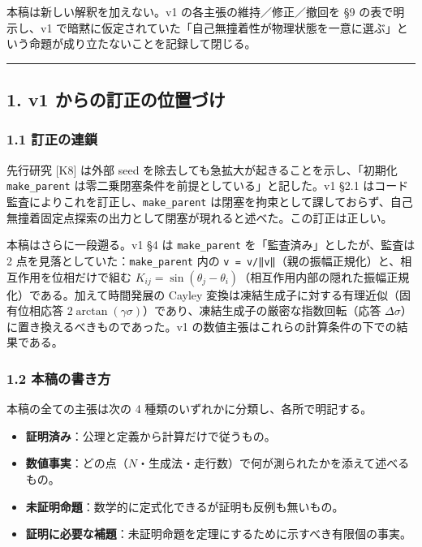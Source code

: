 \documentclass[
  10pt,
  a4paper,
]{ltjsarticle}
\providecommand{\tightlist}{%
  \setlength{\itemsep}{0pt}\setlength{\parskip}{0pt}}
\begin{document}
本稿は新しい解釈を加えない。v1 の各主張の維持／修正／撤回を §9
の表で明示し、v1
で暗黙に仮定されていた「自己無撞着性が物理状態を一意に選ぶ」という命題が成り立たないことを記録して閉じる。

\begin{center}\rule{0.5\linewidth}{0.5pt}\end{center}

\subsection{1. v1
からの訂正の位置づけ}\label{v1-ux304bux3089ux306eux8a02ux6b63ux306eux4f4dux7f6eux3065ux3051}

\subsubsection{1.1 訂正の連鎖}\label{ux8a02ux6b63ux306eux9023ux9396}

先行研究 {[}K8{]} は外部 seed
を除去しても急拡大が起きることを示し、「初期化 \texttt{make\_parent}
は零二乗閉塞条件を前提としている」と記した。v1 §2.1
はコード監査によりこれを訂正し、\texttt{make\_parent}
は閉塞を拘束として課しておらず、自己無撞着固定点探索の出力として閉塞が現れると述べた。この訂正は正しい。

本稿はさらに一段遡る。v1 §4 は \texttt{make\_parent}
を「監査済み」としたが、監査は 2
点を見落としていた：\texttt{make\_parent} 内の
\texttt{v\ =\ v/‖v‖}（親の振幅正規化）と、相互作用を位相だけで組む
\(K_{ij}=\sin(\theta_j-\theta_i)\)（相互作用内部の隠れた振幅正規化）である。加えて時間発展の
Cayley 変換は凍結生成子に対する有理近似（固有位相応答
\(2\arctan(\gamma\sigma)\)）であり、凍結生成子の厳密な指数回転（応答
\(\Delta\sigma\)）に置き換えるべきものであった。v1
の数値主張はこれらの計算条件の下での結果である。

\subsubsection{1.2
本稿の書き方}\label{ux672cux7a3fux306eux66f8ux304dux65b9}

本稿の全ての主張は次の 4 種類のいずれかに分類し、各所で明記する。

\begin{itemize}
\tightlist
\item
  \textbf{証明済み}：公理と定義から計算だけで従うもの。
\item
  \textbf{数値事実}：どの点（\(N\)・生成法・走行数）で何が測られたかを添えて述べるもの。
\item
  \textbf{未証明命題}：数学的に定式化できるが証明も反例も無いもの。
\item
  \textbf{証明に必要な補題}：未証明命題を定理にするために示すべき有限個の事実。
\end{itemize}
\end{document}
